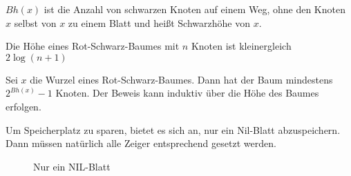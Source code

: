 \begin{definition}
  $Bh(x)$ ist die Anzahl von schwarzen Knoten auf einem Weg, ohne den Knoten $x$  selbst von $x$ zu einem Blatt und heißt
  Schwarzhöhe von $x$.
\end{definition}

\begin{satz} \label{rshoehe}
  Die Höhe eines Rot-Schwarz-Baumes mit $n$ Knoten ist kleinergleich $2\log(n+1)$
\end{satz}
  
\begin{satz} \label{schwarzhoehe}
Sei $x$ die Wurzel eines Rot-Schwarz-Baumes. Dann hat der Baum mindestens $2^{Bh(x)}-1$ Knoten.
  Der Beweis kann induktiv über die Höhe des Baumes erfolgen.
\end{satz}

Um Speicherplatz zu sparen, bietet es sich an, nur ein Nil-Blatt abzuspeichern. Dann müssen natürlich alle Zeiger entsprechend gesetzt
werden.
 
 \begin{figure}[H]
    \centering
    \caption{Nur ein NIL-Blatt}
    \label{241103c}
 \end{figure}

